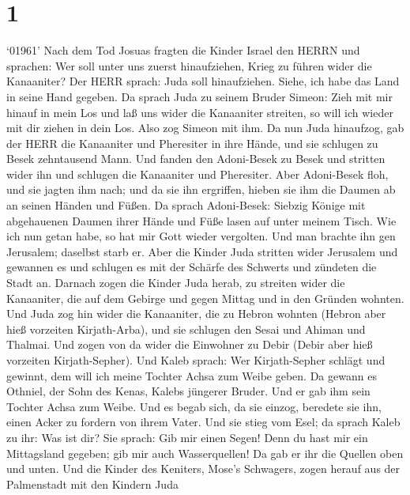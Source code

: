 \hypertarget{section}{%
\section{1}\label{section}}

 `01961' Nach dem Tod Josuas fragten die Kinder Israel den
HERRN und sprachen: Wer soll unter uns zuerst hinaufziehen, Krieg zu
führen wider die Kanaaniter?  Der HERR sprach: Juda soll
hinaufziehen. Siehe, ich habe das Land in seine Hand gegeben.
 Da sprach Juda zu seinem Bruder Simeon: Zieh mit mir hinauf
in mein Los und laß uns wider die Kanaaniter streiten, so will ich
wieder mit dir ziehen in dein Los. Also zog Simeon mit ihm. 
Da nun Juda hinaufzog, gab der HERR die Kanaaniter und Pheresiter in
ihre Hände, und sie schlugen zu Besek zehntausend Mann.  Und
fanden den Adoni-Besek zu Besek und stritten wider ihn und schlugen die
Kanaaniter und Pheresiter.  Aber Adoni-Besek floh, und sie
jagten ihm nach; und da sie ihn ergriffen, hieben sie ihm die Daumen ab
an seinen Händen und Füßen.  Da sprach Adoni-Besek: Siebzig
Könige mit abgehauenen Daumen ihrer Hände und Füße lasen auf unter
meinem Tisch. Wie ich nun getan habe, so hat mir Gott wieder vergolten.
Und man brachte ihn gen Jerusalem; daselbst starb er.  Aber
die Kinder Juda stritten wider Jerusalem und gewannen es und schlugen es
mit der Schärfe des Schwerts und zündeten die Stadt an. 
Darnach zogen die Kinder Juda herab, zu streiten wider die Kanaaniter,
die auf dem Gebirge und gegen Mittag und in den Gründen wohnten.
 Und Juda zog hin wider die Kanaaniter, die zu Hebron
wohnten (Hebron aber hieß vorzeiten Kirjath-Arba), und sie schlugen den
Sesai und Ahiman und Thalmai.  Und zogen von da wider die
Einwohner zu Debir (Debir aber hieß vorzeiten Kirjath-Sepher).
 Und Kaleb sprach: Wer Kirjath-Sepher schlägt und gewinnt,
dem will ich meine Tochter Achsa zum Weibe geben.  Da
gewann es Othniel, der Sohn des Kenas, Kalebs jüngerer Bruder. Und er
gab ihm sein Tochter Achsa zum Weibe.  Und es begab sich,
da sie einzog, beredete sie ihn, einen Acker zu fordern von ihrem Vater.
Und sie stieg vom Esel; da sprach Kaleb zu ihr: Was ist dir?
 Sie sprach: Gib mir einen Segen! Denn du hast mir ein
Mittagsland gegeben; gib mir auch Wasserquellen! Da gab er ihr die
Quellen oben und unten.  Und die Kinder des Keniters,
Mose's Schwagers, zogen herauf aus der Palmenstadt mit den Kindern Juda
